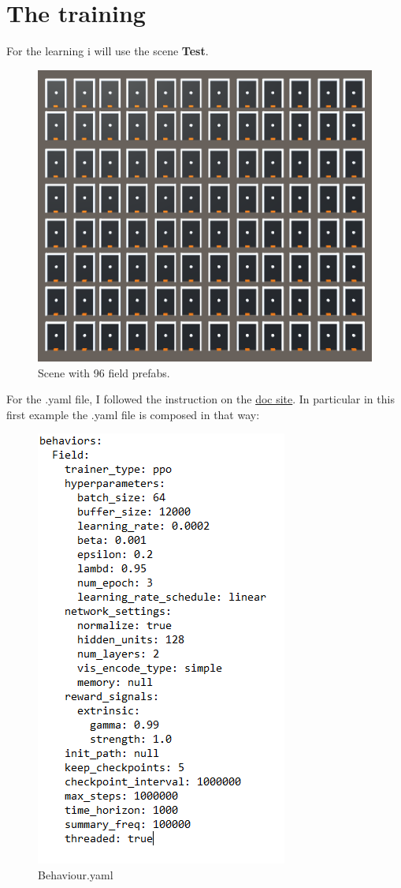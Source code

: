 \documentclass[12pt]{article}
\begin{document}
	\section{The training}
	For the learning i will use the scene \textbf{Test}.
	
	\begin{figure}[hbt!]
		\centering
		\includegraphics[width= 0.76
		\textwidth]{images/NormalTraining1.png}
		\caption{Scene  with 96 field prefabs.}
	\end{figure}
	
	\newpage
	
	\noindent
	For the .yaml file, I followed the instruction on the \href{https://github.com/Unity-Technologies/ml-agents/blob/master/docs/Training-Configuration-File.md}{doc site}. 
	In particular in this first example the .yaml file is composed in that way:
	
	\begin{figure}[hbt!]
		\centering
		\includegraphics[width= 0.6
		\textwidth]{images/Behaviour.png}
		\caption{Behaviour.yaml}
	\end{figure}
	
\end{document}
